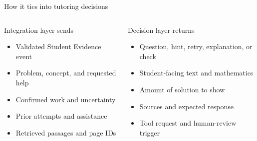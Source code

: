 \documentclass[aspectratio=169,10pt]{beamer}
\begin{document}
\begin{frame}{How it ties into tutoring decisions}
\small
\begin{columns}[T,onlytextwidth]
\begin{block}{Integration layer sends}
\begin{itemize}
\item Validated Student Evidence event
\item Problem, concept, and requested help
\item Confirmed work and uncertainty
\item Prior attempts and assistance
\item Retrieved passages and page IDs
\end{itemize}
\end{block}
\begin{block}{Decision layer returns}
\begin{itemize}
\item Question, hint, retry, explanation, or check
\item Student-facing text and mathematics
\item Amount of solution to show
\item Sources and expected response
\item Tool request and human-review trigger
\end{itemize}
\end{block}
\end{columns}
\vspace{.15em}
\centering
{}
\end{frame}
\end{document}
